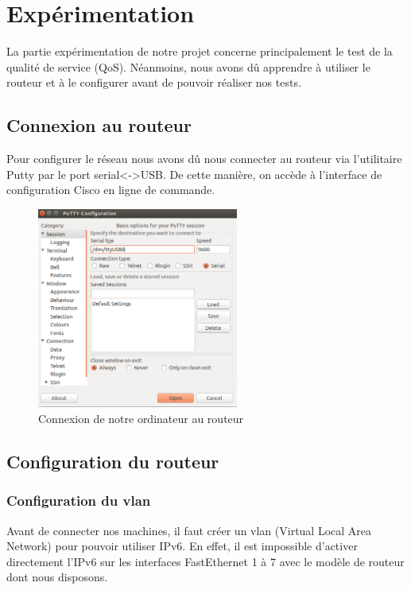 \chapter{Expérimentation}\label{ch:experimentation}

	La partie expérimentation de notre projet concerne principalement le test de la qualité de service (QoS). Néanmoins, nous avons dû apprendre à utiliser le routeur et à le configurer avant de pouvoir réaliser nos tests. 

\section{Connexion au routeur}

	Pour configurer le réseau nous avons dû nous connecter au routeur via l'utilitaire Putty par le port serial<->USB. De cette manière, on accède à l'interface de configuration Cisco en ligne de commande.

            \begin{figure}[h]
            \includegraphics[width=250px]{figures/putty.png}
            \centering
            \caption{Connexion de notre ordinateur au routeur}
            \end{figure}
           
\section{Configuration du routeur}
    
	\subsection{Configuration du vlan}
    
    	Avant de connecter nos machines, il faut créer un vlan (Virtual Local Area Network) pour pouvoir utiliser IPv6. En effet, il est impossible d'activer directement l'IPv6 sur les interfaces FastEthernet 1 à 7 avec le modèle de routeur dont nous disposons.
        
